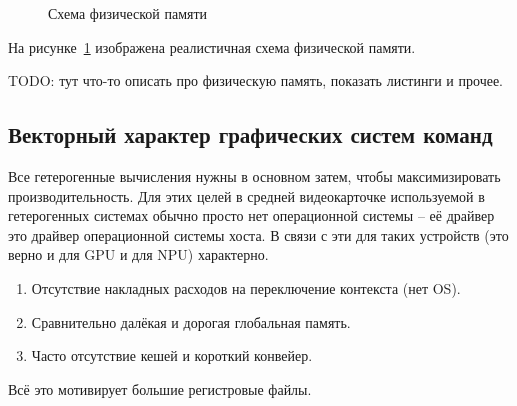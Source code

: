 \begin{figure}[ht]
    \caption{Схема физической памяти}\label{fig:memory-scheme}
\end{figure}

На рисунке~\ref{fig:memory-scheme} изображена реалистичная схема физической памяти.

TODO: тут что-то описать про физическую память, показать листинги и прочее.

\subsection{Векторный характер графических систем команд}\label{subsec:overview/logical/hw}

Все гетерогенные вычисления нужны в основном затем, чтобы максимизировать производительность.
Для этих целей в средней видеокарточке используемой в гетерогенных системах обычно просто нет операционной системы -- её драйвер это драйвер операционной системы хоста.
В связи с эти для таких устройств (это верно и для GPU и для NPU) характерно.

\begin{enumerate}
\item Отсутствие накладных расходов на переключение контекста (нет OS).
\item Сравнительно далёкая и дорогая глобальная память.
\item Часто отсутствие кешей и короткий конвейер.
\end{enumerate}

Всё это мотивирует большие регистровые файлы.

